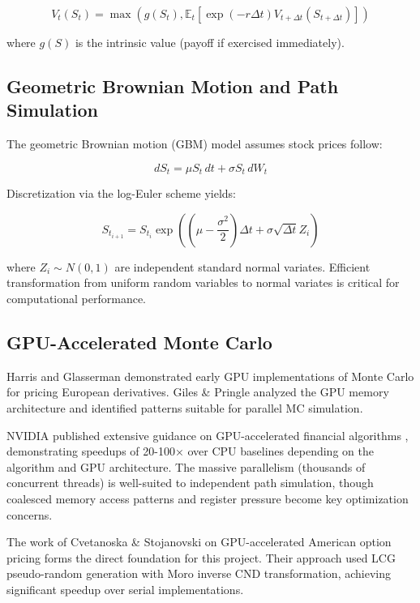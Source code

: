 \documentclass[11pt,a4paper]{article}
\begin{document}
\begin{equation}
V_t(S_t) = \max\left(g(S_t), \mathbb{E}_t[\exp(-r \Delta t) V_{t+\Delta t}(S_{t+\Delta t})]\right)
\end{equation}

where $g(S)$ is the intrinsic value (payoff if exercised immediately).

\subsection{Geometric Brownian Motion and Path Simulation}

The geometric Brownian motion (GBM) model assumes stock prices follow:

\begin{equation}
dS_t = \mu S_t \, dt + \sigma S_t \, dW_t
\end{equation}

Discretization via the log-Euler scheme yields:

\begin{equation}
S_{t_{i+1}} = S_{t_i} \exp\left(\left(\mu - \frac{\sigma^2}{2}\right) \Delta t + \sigma \sqrt{\Delta t} Z_i\right)
\end{equation}

where $Z_i \sim N(0,1)$ are independent standard normal variates. Efficient transformation from uniform random variables to normal variates is critical for computational performance.

\subsection{GPU-Accelerated Monte Carlo}

Harris and Glasserman \cite{harris2006accelerated} demonstrated early GPU implementations of Monte Carlo for pricing European derivatives. Giles \& Pringle \cite{giles2008gpu} analyzed the GPU memory architecture and identified patterns suitable for parallel MC simulation.

NVIDIA published extensive guidance on GPU-accelerated financial algorithms \cite{nvidia2009gpuaccel}, demonstrating speedups of 20-100× over CPU baselines depending on the algorithm and GPU architecture. The massive parallelism (thousands of concurrent threads) is well-suited to independent path simulation, though coalesced memory access patterns and register pressure become key optimization concerns.

The work of Cvetanoska \& Stojanovski \cite{cvetanoska2016using} on GPU-accelerated American option pricing forms the direct foundation for this project. Their approach used LCG pseudo-random generation with Moro inverse CND transformation, achieving significant speedup over serial implementations.
\end{document}

